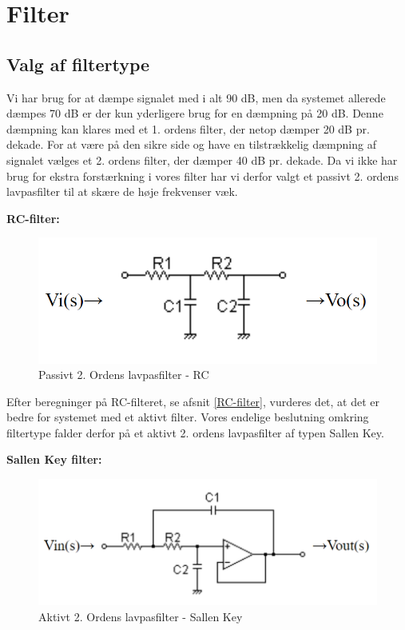 \section{Filter}
\subsection{Valg af filtertype}
\vspace{0.2 cm}
Vi har brug for at dæmpe signalet med i alt 90 dB, men da systemet allerede dæmpes 70 dB er der kun yderligere brug for en dæmpning på 20 dB. Denne dæmpning kan klares med et 1. ordens filter, der netop dæmper 20 dB pr. dekade. For at være på den sikre side og have en tilstrækkelig dæmpning af signalet vælges et 2. ordens filter, der dæmper 40 dB pr. dekade. Da vi ikke har brug for ekstra forstærkning i vores filter har vi derfor valgt et passivt 2. ordens lavpasfilter til at skære de høje frekvenser væk.
\vspace{0.2 cm}

\textbf{RC-filter:}

\vspace{0.2 cm}

\begin{figure}[h!]
	\centering
	\includegraphics[width=0.5\linewidth]{Hardware/RCfilter}
	\caption{Passivt 2. Ordens lavpasfilter - RC}
	\label{fig:RCfilter}
\end{figure}

Efter beregninger på RC-filteret, se afsnit \vref{RC-filter}, vurderes det, at det er bedre for systemet med et aktivt filter. Vores endelige beslutning omkring filtertype falder derfor på et aktivt 2. ordens lavpasfilter af typen Sallen Key.

\textbf{Sallen Key filter:} 

\begin{figure}[h!]
	\centering
	\includegraphics[width=0.5\linewidth]{Hardware/SallenKey}
	\caption{Aktivt 2. Ordens lavpasfilter - Sallen Key}
	\label{fig:SallenKey}
\end{figure}

